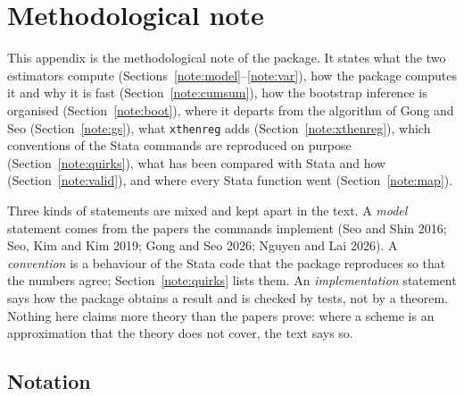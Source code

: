 \documentclass[
  10.5pt,
  a4paper,
]{article}
\begin{document}
\clearpage
\setcounter{secnumdepth}{3}
\appendix
\providecommand{\E}{\operatorname{E}}
\newcommand{\code}[1]{\texttt{\detokenize{#1}}}
\newcommand{\ind}{\mathbf{1}}
\newcommand{\bZ}{\mathbf{Z}}
\newcommand{\bX}{\mathbf{X}}
\newcommand{\diff}{\Delta}
\newcommand{\statasrc}[1]{\texttt{\detokenize{#1}}}

\section{Methodological note}\label{app:note}

This appendix is the methodological note of the package. It states what the two estimators
compute (Sections~\ref{note:model}--\ref{note:var}), how the package computes it and why it is
fast (Section~\ref{note:cumsum}), how the bootstrap inference is organised
(Section~\ref{note:boot}), where it departs from the algorithm of Gong and Seo
(Section~\ref{note:gs}), what \texttt{xthenreg} adds (Section~\ref{note:xthenreg}), which conventions of the
Stata commands are reproduced on purpose (Section~\ref{note:quirks}), what has been compared with Stata and how
(Section~\ref{note:valid}), and where every Stata function went (Section~\ref{note:map}).

Three kinds of statements are mixed and kept apart in the text. A \emph{model} statement comes from
the papers the commands implement (Seo and Shin 2016; Seo, Kim and Kim 2019; Gong and Seo 2026;
Nguyen and Lai 2026). A \emph{convention} is a behaviour of the Stata code that the package
reproduces so that the numbers agree; Section~\ref{note:quirks} lists them. An \emph{implementation}
statement says how the package obtains a result and is checked by tests, not by a theorem.
Nothing here claims more theory than the papers prove: where a scheme is an approximation that the
theory does not cover, the text says so.

\subsection{Notation}\label{note:notation}
\end{document}
